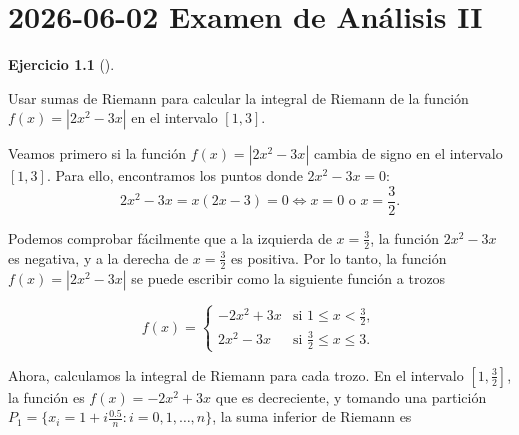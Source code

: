 \documentclass[
  spanish,
  a4paper,
]{scrreport}
\theoremstyle{definition}
\newtheorem{exercise}{Ejercicio}[chapter]
\theoremstyle{remark}
\begin{document}

\chapter{\texorpdfstring{2026-06-02 Examen de Análisis
II}{2026-06-02  Examen de Análisis II}}\label{examen-de-anuxe1lisis-ii-7}

\begin{exercise}[]\protect\hypertarget{exr-1}{}\label{exr-1}

Usar sumas de Riemann para calcular la integral de Riemann de la función
\(f(x) = |2x^2-3x|\) en el intervalo \([1, 3]\).

\end{exercise}

\begin{tcolorbox}[enhanced jigsaw, arc=.35mm, bottomrule=.15mm, bottomtitle=1mm, breakable, colback=white, colbacktitle=quarto-callout-tip-color!10!white, colframe=quarto-callout-tip-color-frame, coltitle=black, left=2mm, leftrule=.75mm, opacityback=0, opacitybacktitle=0.6, rightrule=.15mm, title=\textcolor{quarto-callout-tip-color}{\faLightbulb}\hspace{0.5em}{Solución}, titlerule=0mm, toprule=.15mm, toptitle=1mm]

Veamos primero si la función \(f(x) = |2x^2-3x|\) cambia de signo en el
intervalo \([1, 3]\). Para ello, encontramos los puntos donde
\(2x^2 - 3x = 0\): \[
2x^2 - 3x = x(2x - 3) = 0 \Leftrightarrow x = 0 \text{ o } x = \frac{3}{2}.
\]

Podemos comprobar fácilmente que a la izquierda de \(x = \frac{3}{2}\),
la función \(2x^2 - 3x\) es negativa, y a la derecha de
\(x = \frac{3}{2}\) es positiva. Por lo tanto, la función
\(f(x) = |2x^2-3x|\) se puede escribir como la siguiente función a
trozos

\[
f(x) = \begin{cases}
- 2x^2 + 3x & \text{si } 1 \leq x < \frac{3}{2}, \\
2x^2 - 3x & \text{si } \frac{3}{2} \leq x \leq 3.
\end{cases}
\]

Ahora, calculamos la integral de Riemann para cada trozo. En el
intervalo \([1, \frac{3}{2}]\), la función es \(f(x) = - 2x^2 + 3x\) que
es decreciente, y tomando una partición
\(P_1=\{x_i=1+i\frac{0.5}{n} : i=0,1,\ldots,n\}\), la suma inferior de
Riemann es


\end{tcolorbox}
\end{document}

